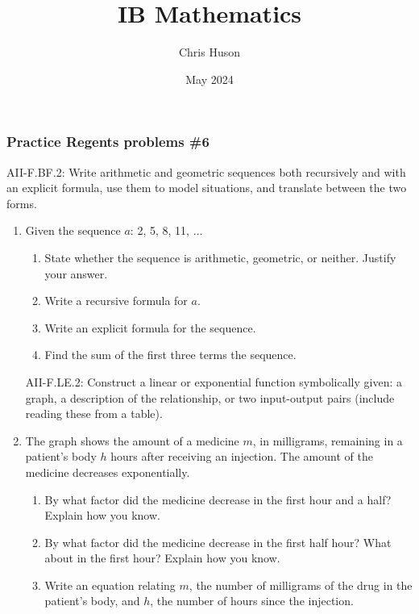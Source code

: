 \documentclass[12pt, twoside]{article}
\title{IB Mathematics}
\author{Chris Huson}
\date{May 2024}
\begin{document}
\subsubsection*{Practice Regents problems \#6}
AII-F.BF.2: Write arithmetic and geometric sequences both recursively and with an explicit formula, use them to model situations, and translate between the two forms.

\begin{enumerate}
\item Given the sequence $a$: 2, 5, 8, 11, $\ldots$
\begin{enumerate}[itemsep=4cm]
    \item State whether the sequence is arithmetic, geometric, or neither. Justify your answer.
    \item Write a recursive formula for $a$.
    \item Write an explicit formula for the sequence.
    \item Find the sum of the first three terms the sequence.
\end{enumerate}

\newpage
AII-F.LE.2: Construct a linear or exponential function symbolically given: a graph, a description of the relationship, or two input-output pairs (include reading these from a table).

\item The graph shows the amount of a medicine $m$, in milligrams, remaining in a patient's body $h$ hours after receiving an injection. The amount of the medicine decreases exponentially.
    \begin{center}
    \end{center}
    \begin{enumerate}[itemsep=3cm]
        \item By what factor did the medicine decrease in the first hour and a half? Explain how you know.
        \item By what factor did the medicine decrease in the first half hour? What about in the first hour? Explain how you know. \vspace{1cm}
        \item Write an equation relating $m$, the number of milligrams of the drug in the patient’s body, and $h$, the number of hours since the injection.
    \end{enumerate}

\end{enumerate}
\end{document}
